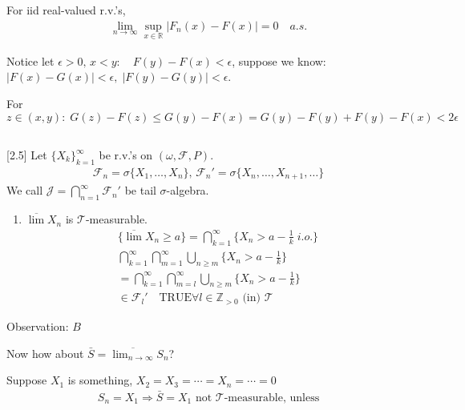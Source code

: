 \documentclass[11pt]{article}
\begin{document}
\begin{theorem}
    For iid real-valued r.v.'s,
    \begin{align*}
        \lim_{n \to \infty}\sup_{x \in \mathbb{R}}|F_n(x) - F(x)| = 0 \quad a.s.
    \end{align*}
\end{theorem}

Notice let $\epsilon > 0,\, x < y: \quad F(y)-F(x) < \epsilon$, suppose we know:
$|F(x) - G(x)| < \epsilon, \; |F(y) - G(y)| < \epsilon$.

For $z \in (x,y): \; G(z) - F(z) \le G(y) - F(x) = G(y) - F(y) + F(y) - F(x) < 2\epsilon$

\subsection{}[2.5]
Let $\{ X_k \}_{k=1}^{\infty}$ be r.v.'s on $(\omega, \mathcal{F}, P)$.
\begin{align*}
    \mathcal{F}_{n} = \sigma\{ X_1, \ldots ,X_n \},\, 
    \mathcal{F}_n' = \sigma \{ X_n, \ldots ,X_{n+1}, \ldots  \}
\end{align*}
We call $\mathcal{J} = \bigcap_{n=1}^{\infty}\mathcal{F}_{n}'$ be tail $\sigma$-algebra.

\begin{example}
    \begin{enumerate}
        \item $\overline{\lim}X_n$ is $\mathcal{T}$-measurable.
        \begin{align*}
            \{ \overline{\lim}X_n \ge a \} = \bigcap_{k=1}^{\infty}\{ X_n >
            a - \frac{1}{k} \;i.o. \}\\
            \bigcap_{k=1}^{\infty}\bigcap_{m=1}^{\infty}\bigcup_{n \ge m} \{ X_n > a - \frac{1}{k} \}\\
            = \bigcap_{k=1}^{\infty}\bigcap_{m=l}^{\infty}\bigcup_{n \ge m} \{ X_n > a - \frac{1}{k} \}\\
            \in \mathcal{F}_{l}' \quad \text{TRUE} \forall  l \in \mathbb{Z}_{>0} \text{ (in) }\mathcal{T}
        \end{align*}
    \end{enumerate}
    Observation: $B$
\end{example}



Now how about $\bar{S} = \overline{\lim_{n \to \infty}}S_n$?

Suppose $X_1$ is something, $X_2 = X_3 = \cdots = X_n = \cdots = 0$
\begin{align*}
    S_n = X_1 \Longrightarrow \bar{S} = X_1 \text{ not }\mathcal{T} \text{-measurable, unless}
\end{align*}
\end{document}
